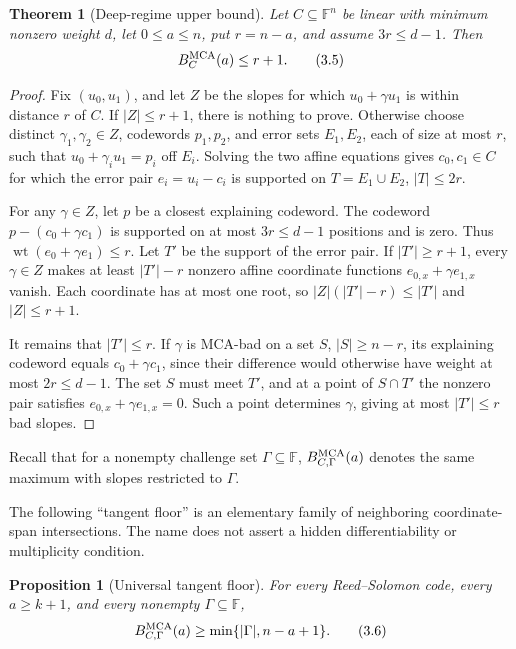 \documentclass[11pt,a4paper]{amsart}
\numberwithin{equation}{section}
\newtheorem{theorem}{Theorem}[section]
\newtheorem{proposition}[proposition]{Proposition}
\theoremstyle{remark}
\DeclareMathOperator{\wt}{wt}
\newcommand{\F}{\mathbb F}
\newcommand{\abs}[1]{\lvert #1\rvert}
\begin{document}
\begin{theorem}[Deep-regime upper bound]\label{thm:deep-regime-upper}
Let \(C\subseteq\F^n\) be linear with minimum nonzero weight \(d\), let
\(0\le a\le n\), put \(r=n-a\), and assume \(3r\le d-1\).  Then
\[
 B_C^{\rm MCA}(a)\le r+1.
 \tag{3.5}\label{eq:deep-upper}
\]
\end{theorem}

\begin{proof}
Fix \((u_0,u_1)\), and let \(Z\) be the slopes for which \(u_0+\gamma u_1\)
is within distance \(r\) of \(C\).  If \(\abs Z\le r+1\), there is nothing
to prove.  Otherwise choose distinct \(\gamma_1,\gamma_2\in Z\), codewords
\(p_1,p_2\), and error sets \(E_1,E_2\), each of size at most \(r\), such
that \(u_0+\gamma_i u_1=p_i\) off \(E_i\).  Solving the two affine
equations gives \(c_0,c_1\in C\) for which the error pair
\(e_i=u_i-c_i\) is supported on \(T=E_1\cup E_2\), \(\abs T\le2r\).

For any \(\gamma\in Z\), let \(p\) be a closest explaining codeword.  The
codeword \(p-(c_0+\gamma c_1)\) is supported on at most \(3r\le d-1\)
positions and is zero.  Thus \(\wt(e_0+\gamma e_1)\le r\).  Let \(T'\) be
the support of the error pair.  If \(\abs{T'}\ge r+1\), every
\(\gamma\in Z\) makes at least \(\abs{T'}-r\) nonzero affine coordinate
functions \(e_{0,x}+\gamma e_{1,x}\) vanish.  Each coordinate has at most
one root, so \(\abs Z(\abs{T'}-r)\le\abs{T'}\) and \(\abs Z\le r+1\).

It remains that \(\abs{T'}\le r\).  If \(\gamma\) is MCA-bad on a set
\(S\), \(\abs S\ge n-r\), its explaining codeword equals
\(c_0+\gamma c_1\), since their difference would otherwise have weight at
most \(2r\le d-1\).  The set \(S\) must meet \(T'\), and at a point of
\(S\cap T'\) the nonzero pair satisfies
\(e_{0,x}+\gamma e_{1,x}=0\).  Such a point determines \(\gamma\), giving
at most \(\abs{T'}\le r\) bad slopes.
\end{proof}

Recall that for a nonempty challenge set \(\Gamma\subseteq\F\),
\(B_{C,\Gamma}^{\rm MCA}(a)\) denotes the same maximum with slopes restricted to
\(\Gamma\).

The following ``tangent floor'' is an elementary family of neighboring
coordinate-span intersections.  The name does not assert a hidden
differentiability or multiplicity condition.

\begin{proposition}[Universal tangent floor]\label{prop:universal-tangent-floor}
For every Reed--Solomon code, every \(a\ge k+1\), and every nonempty
\(\Gamma\subseteq\F\),
\[
 B_{C,\Gamma}^{\rm MCA}(a)
 \ge\min\{\abs\Gamma,n-a+1\}.
 \tag{3.6}\label{eq:tangent-floor}
\]
\end{proposition}
\end{document}
